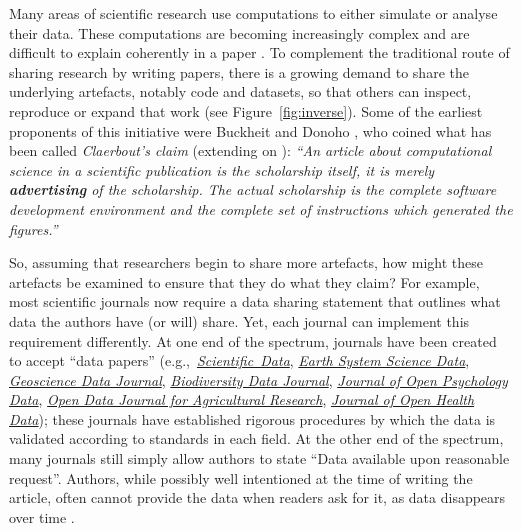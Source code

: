 \documentclass[12pt]{article}
\begin{document}
Many areas of scientific research use computations to either simulate or analyse their data. These computations are becoming increasingly complex and are difficult to explain coherently in a paper \citep{marwick_how_2015}.
To complement the traditional route of sharing research by writing papers,
there is a growing demand to share the underlying artefacts, notably 
code and datasets, so that others can inspect, reproduce or expand that work
(see Figure~\ref{fig:inverse}).
Some of the earliest proponents of this initiative were Buckheit and Donoho \cite{buckheit_wavelab_1995}, who coined what has been called \emph{Claerbout's claim} (extending on \citet{claerbout_electronic_1992}):
\emph{``An article about computational science in a scientific publication 
is  the scholarship itself, it is merely \textbf{advertising} of
the scholarship. The actual scholarship is the complete software development
environment and the complete set of instructions which generated the 
figures.''}

So, assuming that researchers begin to share more artefacts, how might these artefacts be examined to ensure that they do what they claim?
For example,
most scientific journals now require a data sharing statement that
outlines what data the authors have (or will) share.
Yet, each journal can implement this requirement differently.
At one end of the spectrum, journals have been created to accept ``data papers''
(e.g.,~\href{https://www.nature.com/sdata/}{\emph{Scientific~Data}}, 
\href{https://essd.copernicus.org/}{\emph{Earth System Science Data}}, 
\href{https://rmets.onlinelibrary.wiley.com/journal/20496060}{\emph{Geoscience Data Journal}},
\href{https://bdj.pensoft.net/}{\emph{Biodiversity Data Journal}},
\href{https://openpsychologydata.metajnl.com/}{\emph{Journal of Open Psychology Data}},
\href{https://odjar.org/}{\emph{Open Data Journal for Agricultural Research}},
\href{https://openhealthdata.metajnl.com}{\emph{Journal of Open Health Data}});
these journals have established rigorous procedures by which
the data is validated according to standards in each field.
At the other end of the spectrum, many journals still simply allow authors to state ``Data available upon reasonable request''.
Authors, while possibly well intentioned at the time of writing the article, often cannot provide the data when readers ask for it, as data disappears over time \cite{Vines2014-hf}.
\end{document}
